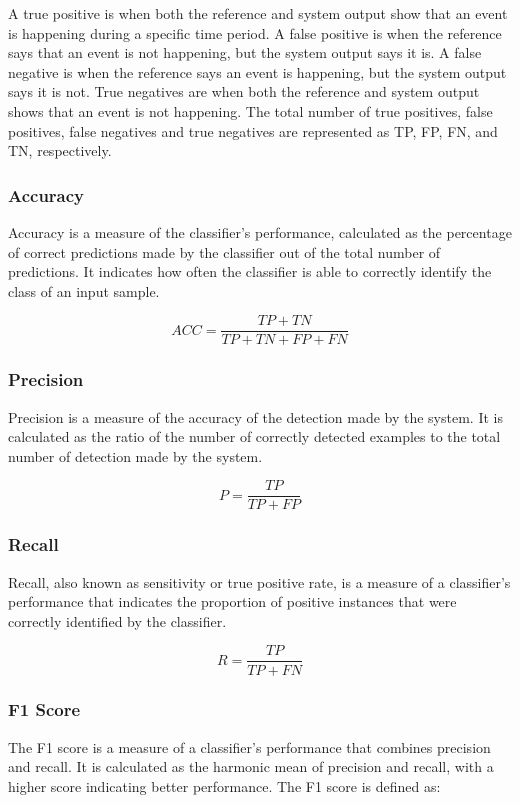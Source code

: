 A true positive is when both the reference and system output show that an event is happening during a specific time period. A false positive is when the reference says that an event is not happening, but the system output says it is. A false negative is when the reference says an event is happening, but the system output says it is not. True negatives are when both the reference and system output shows that an event is not happening. The total number of true positives, false positives, false negatives and true negatives are represented as TP, FP, FN, and TN, respectively.

\subsubsection{Accuracy}
Accuracy is a measure of the classifier's performance, calculated as the percentage of correct predictions made by the classifier out of the total number of predictions. It indicates how often the classifier is able to correctly identify the class of an input sample.

\begin{equation}
\label{eq:accuracy}
    ACC = \frac{TP + TN}{TP + TN + FP + FN}
\end{equation}

\subsubsection{Precision}
Precision is a measure of the accuracy of the detection made by the system. It is calculated as the ratio of the number of correctly detected examples to the total number of detection made by the system.

\begin{equation}
\label{eq:precision}
    P = \frac{TP }{TP + FP}
\end{equation}


\subsubsection{Recall}
Recall, also known as sensitivity or true positive rate, is a measure of a classifier's performance that indicates the proportion of positive instances that were correctly identified by the classifier. 

\begin{equation}
\label{eq:recall}
    R = \frac{TP}{TP + FN}
\end{equation}


\subsubsection{F1 Score}
The F1 score is a measure of a classifier's performance that combines precision and recall. It is calculated as the harmonic mean of precision and recall, with a higher score indicating better performance. The F1 score is defined as:

